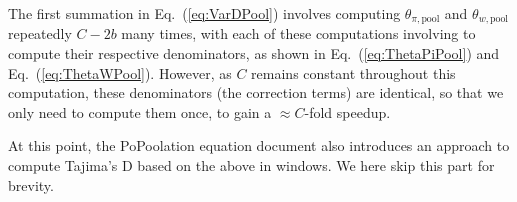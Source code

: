 \documentclass[a4paper,9pt,DIV=14]{scrartcl}
\newcounter{todo}
\newcommand\todo[1]{}
\newcommand\eqnref[1]{Eq.~(\ref{#1})}
\begin{document}
The first summation in \eqnref{eq:VarDPool} involves computing $\theta_{\pi,\text{pool}}$ and 
$\theta_{w,\text{pool}}$ repeatedly $C-2b$ many times, 
with each of these computations involving to compute their respective denominators,
as shown in \eqnref{eq:ThetaPiPool} and \eqnref{eq:ThetaWPool}.
However, as $C$ remains constant throughout this computation, these denominators (the correction terms)
are identical, so that we only need to compute them once, to gain a $\approx C$-fold speedup.

At this point, the PoPoolation equation document also introduces an approach to compute Tajima's D based on the above in windows.
We here skip this part for brevity.






\end{document}
